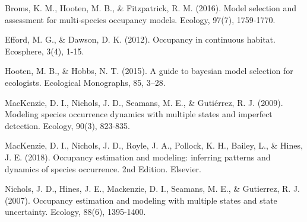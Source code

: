 \documentclass[12pt]{article}
\begin{document}
\begin{thebibliography}{100}
Broms, K. M., Hooten, M. B., \& Fitzpatrick, R. M. (2016). Model selection and assessment for multi‐species occupancy models. Ecology, 97(7), 1759-1770.

Efford, M. G., \& Dawson, D. K. (2012). Occupancy in continuous habitat. Ecosphere, 3(4), 1-15.


Hooten, M. B., \& Hobbs, N. T. (2015). A guide to bayesian model selection for ecologists. Ecological Monographs, 85, 3–28.

MacKenzie, D. I., Nichols, J. D., Seamans, M. E., \& Gutiérrez, R. J. (2009). Modeling species occurrence dynamics with multiple states and imperfect detection. Ecology, 90(3), 823-835.

MacKenzie, D. I., Nichols, J. D., Royle, J. A., Pollock, K. H., Bailey, L., \& Hines, J. E. (2018). Occupancy estimation and modeling: inferring patterns and dynamics of species occurrence. 2nd Edition. Elsevier.

Nichols, J. D., Hines, J. E., Mackenzie, D. I., Seamans, M. E., \& Gutierrez, R. J. (2007). Occupancy estimation and modeling with multiple states and state uncertainty. Ecology, 88(6), 1395-1400.
\end{thebibliography}
\end{document}
